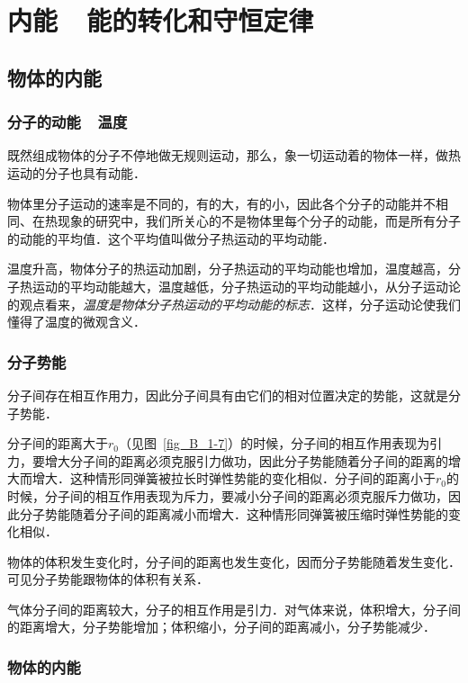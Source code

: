 \chapter{内能~~能的转化和守恒定律}\label{chapter-internal-energy-and-laws-of-conversion-and-conservation-of-sssenergy}


\section{物体的内能}
\subsection{分子的动能~~温度}
既然组成物体的分子不停地做无规则运动，那么，象一切运动着的物体一样，做热运动的分子也具有动能．

物体里分子运动的速率是不同的，有的大，有的小，因此各个分子的动能并不相同、在热现象的研究中，我们所关心的不是物体里每个分子的动能，而是所有分子的动能的平均值．这个平均值叫做分子热运动的平均动能．

温度升高，物体分子的热运动加剧，分子热运动的平均动能也增加，温度越高，分子热运动的平均动能越大，温度越低，分子热运动的平均动能越小，从分子运动论的观点看来，\textit{温度是物体分子热运动的平均动能的标志}．这样，分子运动论使我们懂得了温度的微观含义．

\subsection{分子势能} 

分子间存在相互作用力，因此分子间具有由它们的相对位置决定的势能，这就是分子势能．

分子间的距离大于$r_0$（见图~\ref{fig_B_1-7}）的时候，分子间的相互作用表现为引力，要增大分子间的距离必须克服引力做功，因此分子势能随着分子间的距离的增大而增大．这种情形同弹簧被拉长时弹性势能的变化相似．分子间的距离小于$r_0$的
时候，分子间的相互作用表现为斥力，要减小分子间的距离必须克服斥力做功，因此分子势能随着分子间的距离减小而增大．这种情形同弹簧被压缩时弹性势能的变化相似．

物体的体积发生变化时，分子间的距离也发生变化，因而分子势能随着发生变化．可见分子势能跟物体的体积有关系．

气体分子间的距离较大，分子的相互作用是引力．对气体来说，体积增大，分子间的距离增大，分子势能增加；体积缩小，分子间的距离减小，分子势能减少．

\subsection{物体的内能} 

